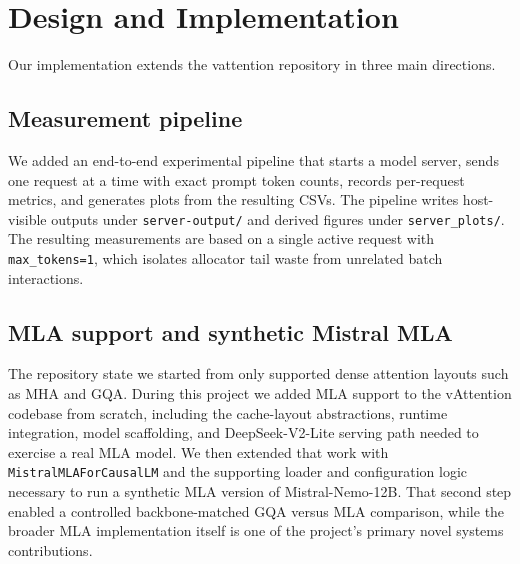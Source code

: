\documentclass[conference]{IEEEtran}
\begin{document}
\section{Design and Implementation}
Our implementation extends the vattention repository in three main directions.

\subsection{Measurement pipeline}
We added an end-to-end experimental pipeline that starts a model server, 
sends one request at a time with exact prompt token counts, records 
per-request metrics, and generates plots from the resulting CSVs. 
The pipeline writes host-visible outputs under \texttt{server-output/} 
and derived figures under \texttt{server\_plots/}. The resulting 
measurements are based on a single active request with \texttt{max\_tokens=1}, 
which isolates allocator tail waste from unrelated batch interactions.

\subsection{MLA support and synthetic Mistral MLA}
The repository state we started from only supported dense 
attention layouts such as MHA and GQA. During this project we 
added MLA support to the vAttention codebase from scratch, including 
the cache-layout abstractions, runtime integration, model scaffolding, 
and DeepSeek-V2-Lite serving path needed to exercise a real MLA model. 
We then extended that work with \texttt{MistralMLAForCausalLM} and 
the supporting loader and configuration logic necessary to run a 
synthetic MLA version of Mistral-Nemo-12B. That second step enabled 
a controlled backbone-matched GQA versus MLA comparison, while 
the broader MLA implementation itself is one of the project's 
primary novel systems contributions.
\end{document}
